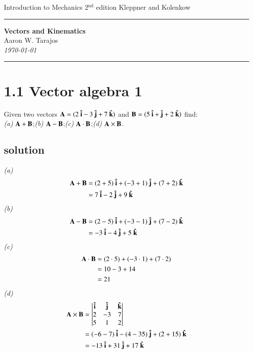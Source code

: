 \documentclass{article}
\newcommand{\vi}{\vb{\hat i}}
\newcommand{\vj}{\vb{\hat j}}
\newcommand{\vk}{\vb{\hat k}}
\begin{document}
\noindent
Introduction to Mechanics 2$^\text{nd}$ edition  \hfill Kleppner and Kolenkow

\noindent\rule{\textwidth}{0.4pt}

\begin{center}
    \textbf{\LARGE Vectors and Kinematics} \\
    \vspace{12pt}
    \large Aaron W. Tarajos \\
    \textit{\today}
\end{center}

\noindent\rule{\textwidth}{0.4pt}

\section*{1.1 Vector algebra 1}
Given two vectors $\vb A = (2\ \vi -3\ \vj + 7\ \vk)$ and $\vb B = (5\ \vi + \vj + 2\ \vk)$ find:\\
\textit{(a)} $\vb A + \vb B$;\quad	\textit{(b)} $\vb A - \vb B$;\quad	\textit{(c)} $\vb A \cdot \vb B$;\quad	\textit{(d)} $\vb A \times \vb B$.

\subsection*{solution}
\textit{(a)}
\begin{align*}
	\vb A + \vb B &= (2+5)\ \vi + (-3 + 1)\ \vj + (7+2)\ \vk \\
	&= 7\ \vi -2\ \vj + 9\ \vk
\end{align*}
\textit{(b)}
\begin{align*}
	\vb A - \vb B &= (2-5)\ \vi + (-3 - 1)\ \vj + (7-2)\ \vk \\
	&= -3\ \vi -4\ \vj + 5\ \vk
\end{align*}
\textit{(c)}
\begin{align*}
	\vb A \cdot \vb B &= (2\cdot 5) + (-3 \cdot 1) + (7 \cdot 2) \\
	&= 10-3+14 \\
	&= 21
\end{align*}
\textit{(d)}
\begin{align*}
	\vb A \times \vb B &=
\begin{vmatrix}
	\vi & \vj & \vk \\
	2 & -3 & 7 \\
	5 & 1 & 2
\end{vmatrix}\\
	&= (-6-7)\ \vi -(4-35)\ \vj + (2+15)\ \vk \\
	&= -13\ \vi + 31\ \vj + 17\ \vk
\end{align*}
	
\end{document}
